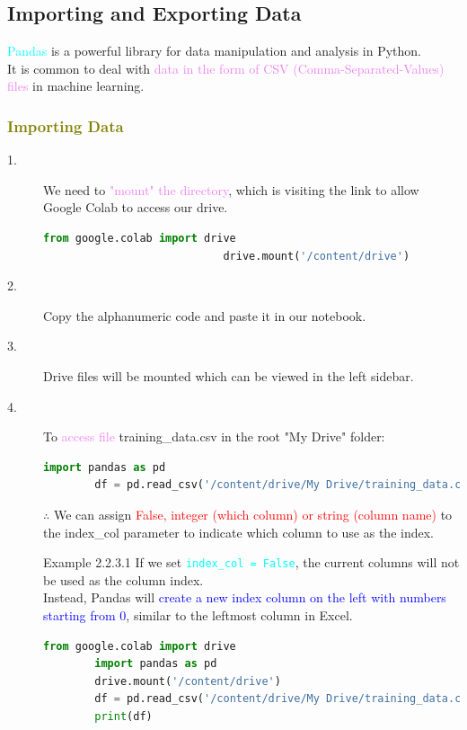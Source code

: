 \documentclass{book}
\begin{document}
\subsection{Importing and Exporting Data}
\textcolor{cyan}{Pandas} is a powerful library for data manipulation and analysis in Python.\\
It is common to deal with \textcolor{violet}{data in the form of CSV (Comma-Separated-Values) files} in machine learning.\\
\textcolor{olive}{\subsubsection{Importing Data}}
\begin{description}
    \item[1.] We need to \textcolor{violet}{"mount" the directory}, which is visiting the link to allow Google Colab to access our drive.
    \begin{lstlisting}[language=Python, basicstyle=\ttfamily\small, keywordstyle=\color{blue}, commentstyle=\color{forestgreen}, stringstyle=\color{red}, showstringspaces=false]
                            from google.colab import drive
                            drive.mount('/content/drive')
    \end{lstlisting}
    \item[2.] Copy the alphanumeric code and paste it in our notebook.
    \item[3.] Drive files will be mounted which can be viewed in the left sidebar.
    \item[4.] To \textcolor{violet}{access file} training\_data.csv in the root "My Drive" folder:
    \begin{lstlisting}[language=Python, basicstyle=\ttfamily\small, keywordstyle=\color{blue}, commentstyle=\color{forestgreen}, stringstyle=\color{red}, showstringspaces=false]
        import pandas as pd
        df = pd.read_csv('/content/drive/My Drive/training_data.csv', index_col = False)
    \end{lstlisting}
    $\therefore$ We can assign \textcolor{red}{False, integer (which column) or string (column name)} to the index\_col parameter to indicate which column to use as the index.
    \begin{egBox}{Example 2.2.3.1}{} 
        If we set \textcolor{cyan}{\texttt{index\_col = False}}, the current columns will not be used as the column index.\\
        Instead, Pandas will \textcolor{blue}{create a new index column on the left with numbers starting from 0}, similar to the leftmost column in Excel.
        \begin{lstlisting}[language=Python, basicstyle=\ttfamily\small, keywordstyle=\color{blue}, commentstyle=\color{forestgreen}, stringstyle=\color{red}, showstringspaces=false]
        from google.colab import drive
        import pandas as pd
        drive.mount('/content/drive')
        df = pd.read_csv('/content/drive/My Drive/training_data.csv', index_col = False)
        print(df)


\end{lstlisting}
\end{egBox}
\end{description}
\end{document}
